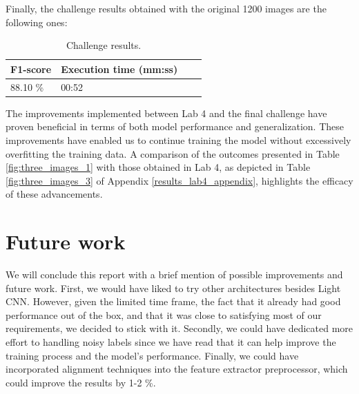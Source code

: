 \documentclass[11pt, a4paper]{article}
\numberwithin{equation}{subsection}
\begin{document}
Finally, the challenge results obtained with the original 1200 images are the following ones:

\begin{table}[htbp]
    \centering
    \label{tab:challenge_results}
    \caption{Challenge results.}
    \begin{tabular}{|l|l|l|l|}
    \hline
    \textbf{F1-score} & \textbf{Execution time (mm:ss)} \\ \hline
    88.10 \% & 00:52 \\
    \hline
    \end{tabular}
\end{table}

The improvements implemented between Lab 4 and the final challenge have proven beneficial in terms of both model performance and generalization. These improvements have enabled us to continue training the model without excessively overfitting the training data. A comparison of the outcomes presented in Table \ref{fig:three_images_1} with those obtained in Lab 4, as depicted in Table \ref{fig:three_images_3} of Appendix \ref{results_lab4_appendix}, highlights the efficacy of these advancements.

\section{Future work}

We will conclude this report with a brief mention of possible improvements and future work. First, we would have liked to try other architectures besides Light CNN. However, given the limited time frame, the fact that it already had good performance out of the box, and that it was close to satisfying most of our requirements, we decided to stick with it. Secondly, we could have dedicated more effort to handling noisy labels since we have read that it can help improve the training process and the model's performance. Finally, we could have incorporated alignment techniques into the feature extractor preprocessor, which could improve the results by 1-2 \%.

\newpage


\end{document}
